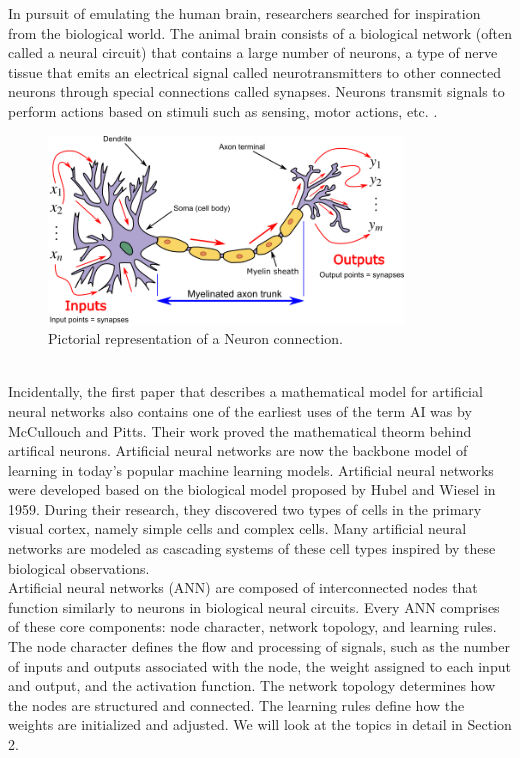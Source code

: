 In pursuit of emulating the human brain, researchers searched for inspiration from the biological world. The animal brain consists of a biological network (often called a neural circuit) that contains a large number of neurons, a type of nerve tissue that emits an electrical signal called neurotransmitters to other connected neurons through special connections called synapses. Neurons transmit signals to perform actions based on stimuli such as sensing, motor actions, etc. \cite{enwiki:1190738251}.
\begin{figure}[H]
    \centering
    \includegraphics[width=\textwidth,height=5cm,keepaspectratio=true]{src/Images/Neuron3.png}
    \caption{
         Pictorial representation of a Neuron connection\cite{neuron_img}. 
    }
\end{figure}
\\ 
Incidentally, the first paper that describes a mathematical model for artificial neural networks also contains one of the earliest uses of the term AI was by McCullouch and Pitts. Their work proved the mathematical theorm behind artifical neurons. Artificial neural networks are now the backbone model of learning in today's popular machine learning models. Artificial neural networks were developed based on the biological model proposed by Hubel and Wiesel in 1959. During their research, they discovered two types of cells in the primary visual cortex, namely simple cells and complex cells. Many artificial neural networks are modeled as cascading systems of these cell types inspired by these biological observations. \cite{8259629}\\

Artificial neural networks (ANN) are composed of interconnected nodes that function similarly to neurons in biological neural circuits. Every ANN comprises of these core components: node character, network topology, and learning rules. The node character defines the flow and processing of signals, such as the number of inputs and outputs associated with the node, the weight assigned to each input and output, and the activation function. The network topology determines how the nodes are structured and connected. The learning rules define how the weights are initialized and adjusted. We will look at the topics in detail in Section 2.  \cite{livingstone2008artificial}

